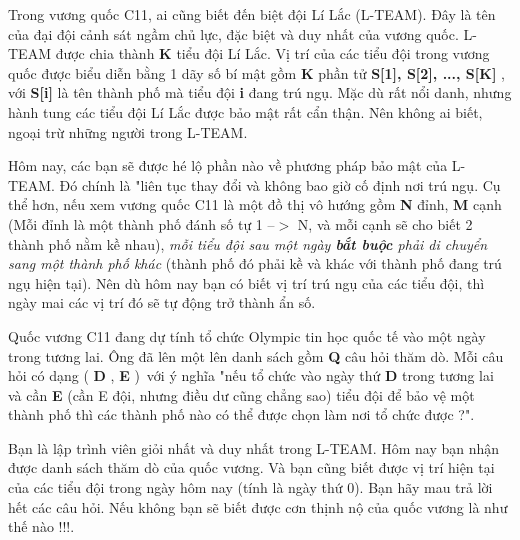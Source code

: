 Trong vương quốc C11, ai cũng biết đến biệt đội Lí Lắc (L-TEAM). Đây là tên của đại đội cảnh sát ngầm chủ lực, đặc biệt và duy nhất của vương quốc. L-TEAM được chia thành   \textbf{    K   }   tiểu đội Lí Lắc. Vị trí của các tiểu đội trong vương quốc được biểu diễn bằng 1 dãy số bí mật gồm   \textbf{    K   }   phần tử   \textbf{    S[1], S[2], ..., S[K]   }   , với   \textbf{    S[i]   }   là tên thành phố mà tiểu đội   \textbf{    i   }   đang trú ngụ. Mặc dù rất nổi danh, nhưng hành tung các tiểu đội Lí Lắc được bảo mật rất cẩn thận. Nên không ai biết, ngoại trừ những người trong L-TEAM.  

   Hôm nay, các bạn sẽ được hé lộ phần nào về phương pháp bảo mật của L-TEAM. Đó chính là "liên tục thay đổi và không bao giờ cố định nơi trú ngụ. Cụ thể hơn, nếu xem vương quốc C11 là một đồ thị vô hướng gồm   \textbf{    N   }   đỉnh,   \textbf{    M   }   cạnh (Mỗi đỉnh là một thành phố đánh số tự 1 --$>$ N, và mỗi cạnh sẽ cho biết 2 thành phố nằm kề nhau),   \emph{    mỗi tiểu đội sau một ngày    \textbf{     bắt buộc    }    phải di chuyển sang một thành phố khác   }   (thành phố đó phải kề và khác với thành phố đang trú ngụ hiện tại). Nên dù hôm nay bạn có biết vị trí trú ngụ của các tiểu đội, thì ngày mai các vị trí đó sẽ tự động trở thành ẩn số.  

   Quốc vương C11 đang dự tính tổ chức Olympic tin học quốc tế vào một ngày trong tương lai. Ông đã lên một lên danh sách gồm   \textbf{    Q   }   câu hỏi thăm dò. Mỗi câu hỏi có dạng   \textbf{}   (   \textbf{    D   }   ,   \textbf{    E   }   ) với ý nghĩa "nếu tổ chức vào ngày thứ   \textbf{    D   }   trong tương lai và cần   \textbf{    E   }   (cần E đội, nhưng điều dư cũng chẳng sao) tiểu đội để bảo vệ một thành phố thì các thành phố nào có thể được chọn làm nơi tổ chức được ?".  

   Bạn là lập trình viên giỏi nhất và duy nhất trong L-TEAM. Hôm nay bạn nhận được danh sách thăm dò của quốc vương. Và bạn cũng biết được vị trí hiện tại của các tiểu đội trong ngày hôm nay (tính là ngày thứ 0). Bạn hãy mau trả lời hết các câu hỏi. Nếu không bạn sẽ biết được cơn thịnh nộ của quốc vương là như thế nào !!!.